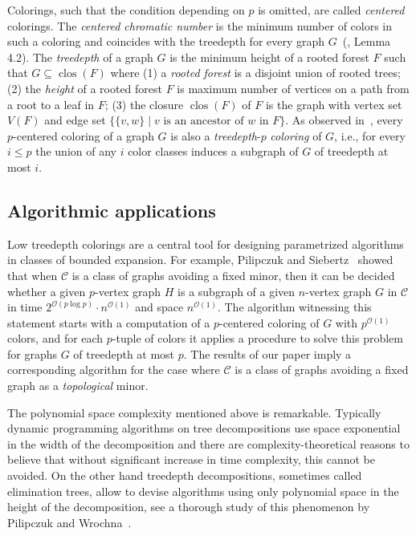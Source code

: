 Colorings, such that the condition depending on $p$ is omitted, are called \emph{centered}
colorings. The \emph{centered chromatic number} is the minimum number of colors in such a
coloring and coincides with the treedepth for every graph $G$~(\cite{NOdM06}, Lemma 4.2).
The \emph{treedepth} of a graph $G$ is the minimum height of a rooted forest 
$F$ such that $G\subseteq \operatorname{clos}(F)$ where 
(1) a \emph{rooted forest} is a
disjoint union of rooted trees; 
(2) the \emph{height} of a rooted forest $F$ is maximum number of vertices on 
a path from a root to a leaf in $F$;
(3) the closure $\operatorname{clos}(F)$ of $F$ is the graph with vertex set $V(F)$ and 
edge set $\{\{v,w\}\mid \text{$v$ is an ancestor of $w$ in $F$}\}$.
As observed in~\cite{NOdM06},  every $p$-centered coloring of a graph $G$ 
is also a \emph{treedepth}-$p$ \emph{coloring} of $G$, i.e., for every $i\leq p$
the union of any $i$ color classes induces a subgraph of $G$ of treedepth at most $i$.

\subsection{Algorithmic applications}
Low treedepth colorings are a central tool for designing parametrized algorithms 
in classes of bounded expansion.
For example, Pilipczuk and Siebertz~\cite{PS19} showed that when $\mathcal{C}$ 
is a class of graphs avoiding a fixed minor,
then it can be decided whether a given $p$-vertex graph $H$ is a subgraph of a given $n$-vertex
graph $G$ in $\mathcal{C}$ in time $2^{\mathcal{O}(p\log p)}\cdot n^{\mathcal{O}(1)}$ and space $n^{\mathcal{O}(1)}$.
The algorithm witnessing this statement starts with a computation 
of a $p$-centered coloring of $G$ with $p^{\mathcal{O}(1)}$ colors, and 
for each $p$-tuple of colors it applies a procedure 
to solve this problem for graphs $G$ of treedepth at most $p$.
The results of our paper imply a corresponding algorithm for the case where
$\mathcal{C}$ is a class of graphs avoiding a fixed graph 
as a \emph{topological} minor.

The polynomial space complexity mentioned above is remarkable.  Typically
dynamic programming algorithms on tree decompositions use space exponential in
the width of the decomposition and there are complexity-theoretical reasons to
believe that without significant increase in time complexity, this cannot be
avoided.  On the other hand treedepth decompositions, sometimes called
elimination trees, allow to devise algorithms using only polynomial space in
the height of the decomposition, see a thorough study of this phenomenon by
Pilipczuk and Wrochna~\cite{PW18}.

